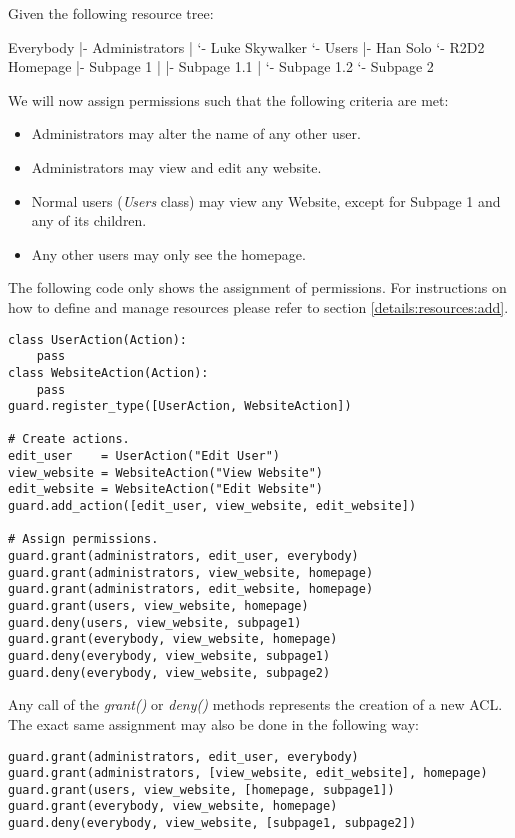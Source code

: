 Given the following resource tree:

\begin{indentverb}
Everybody
  |- Administrators
  |   `- Luke Skywalker
  `- Users
      |- Han Solo
      `- R2D2
Homepage
  |- Subpage 1
  |   |- Subpage 1.1
  |   `- Subpage 1.2
  `- Subpage 2
\end{indentverb}

We will now assign permissions such that the following criteria are met:

\begin{itemize}
\item Administrators may alter the name of any other user.
\item Administrators may view and edit any website.
\item Normal users ({\it Users} class) may view any Website, except for 
Subpage 1 and any of its children.
\item Any other users may only see the homepage.
\end{itemize}

The following code only shows the assignment of permissions. For instructions 
on how to define and manage resources please refer to section 
\ref{details:resources:add}.

\begin{lstlisting}
class UserAction(Action):
    pass
class WebsiteAction(Action):
    pass
guard.register_type([UserAction, WebsiteAction])

# Create actions.
edit_user    = UserAction("Edit User")
view_website = WebsiteAction("View Website")
edit_website = WebsiteAction("Edit Website")
guard.add_action([edit_user, view_website, edit_website])

# Assign permissions.
guard.grant(administrators, edit_user, everybody)
guard.grant(administrators, view_website, homepage)
guard.grant(administrators, edit_website, homepage)
guard.grant(users, view_website, homepage)
guard.deny(users, view_website, subpage1)
guard.grant(everybody, view_website, homepage)
guard.deny(everybody, view_website, subpage1)
guard.deny(everybody, view_website, subpage2)
\end{lstlisting}

Any call of the {\it grant()} or {\it deny()} methods represents the creation 
of a new ACL. The exact same assignment may also be done in the following way:

\begin{lstlisting}
guard.grant(administrators, edit_user, everybody)
guard.grant(administrators, [view_website, edit_website], homepage)
guard.grant(users, view_website, [homepage, subpage1])
guard.grant(everybody, view_website, homepage)
guard.deny(everybody, view_website, [subpage1, subpage2])
\end{lstlisting}

